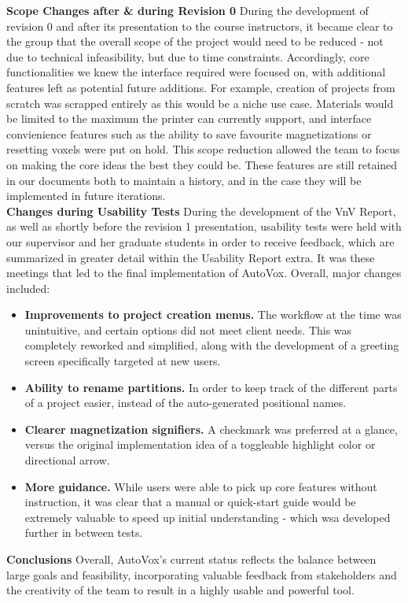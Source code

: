 \documentclass[12pt, titlepage]{article}
\begin{document}
\noindent\textbf{Scope Changes after \& during Revision 0}
\newline
During the development of revision 0 and after its presentation to the course instructors, it became clear to 
the group that the overall scope of the project would need to be reduced - not due to technical infeasibility, 
but due to time constraints. Accordingly, core functionalities we knew the interface required were focused on, 
with additional features left as potential future additions. For example, creation of projects from scratch was 
scrapped entirely as this would be a niche use case. Materials would be limited to the maximum the printer can 
currently support, and interface convienience features such as the ability to save favourite magnetizations
or resetting voxels were put on hold. This scope reduction allowed the team to focus on making the core ideas
the best they could be. These features are still retained in our documents both to maintain a history, and in the
case they will be implemented in future iterations.\\

\noindent\textbf{Changes during Usability Tests}
\newline
During the development of the VnV Report, as well as shortly before the revision 1 presentation, usability tests were
held with our supervisor and her graduate students in order to receive feedback, which are summarized in greater 
detail within the Usability Report extra. It was these meetings that led to the final implementation of AutoVox.
Overall, major changes included:

\begin{itemize}
  \item\textbf{Improvements to project creation menus.} The workflow at the time was unintuitive, and certain options 
  did not meet client needs. This was completely reworked and simplified, along with the development of a greeting screen 
  specifically targeted at new users.
  \item\textbf{Ability to rename partitions.} In order to keep track of the different parts of a project easier, instead of 
  the auto-generated positional names.
  \item\textbf{Clearer magnetization signifiers.} A checkmark was preferred at a glance, versus the original implementation 
  idea of a toggleable highlight color or directional arrow.
  \item\textbf{More guidance.} While users were able to pick up core features without instruction, it was clear that a manual
  or quick-start guide would be extremely valuable to speed up initial understanding - which wsa developed further in between tests.
\end{itemize}
\noindent\textbf{Conclusions}
\newline
Overall, AutoVox's current status reflects the balance between large goals and feasibility, incorporating valuable feedback from
stakeholders and the creativity of the team to result in a highly usable and powerful tool.
\end{document}
